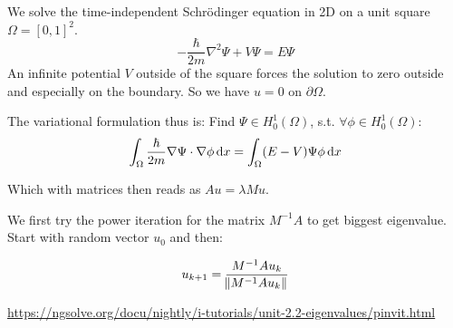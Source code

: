 \documentclass[a4paper,11pt]{scrartcl}
\newcommand*{\dx}{\dif{}x}
\begin{document}
We solve the time-independent Schrödinger equation in 2D on a unit square
$\Omega = [0,1]^2$.
\[ -\frac{\hbar}{2m} \nabla^2 \Psi + V \Psi = E \Psi\]
An infinite potential $V$ outside of the square forces the solution to zero
outside and especially on the boundary.
So we have $u = 0$ on $\partial\Omega$.

The variational formulation thus is:
Find $\Psi \in H^1_0(\Omega)$, s.t. $\forall \phi \in H^1_0(\Omega)$:
\[ \int_{\Omega} \frac{\hbar}{2m} \nabla \Psi \cdot \nabla\phi \dx =
  \int_{\Omega} (E - V) \Psi \phi\dx\]

Which with matrices then reads as $A u = \lambda M u$.

We first try the power iteration for the matrix $M^{-1} A$ to get biggest eigenvalue.
Start with random vector $u_0$ and then:

\[ u_{k+1} = \frac{M^{-1} A u_k}{\norm{M^{-1}Au_k}}\]

\url{https://ngsolve.org/docu/nightly/i-tutorials/unit-2.2-eigenvalues/pinvit.html}
\end{document}
